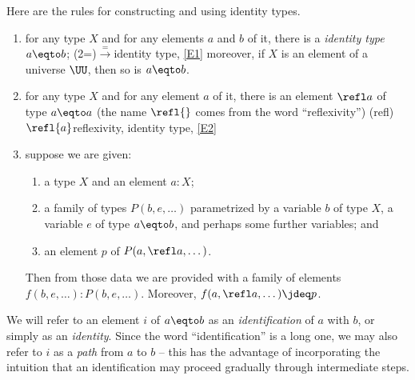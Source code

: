Here are the rules for constructing and using identity types.
\begin{enumerate}[label=(E\arabic*),ref=(E\arabic*)]\label{rules-for-equality}
  \item\label{E1}
    for any type $X$ and for any elements $a$ and $b$ of it, there is a \emph{identity type} $a \eqto b$;%
    \glossary(2=){$\xrightarrow =$}{identity type, \cref{E1}}%
    moreover, if $X$ is an element of a universe $\UU$, then so is $a \eqto b$.
  \item\label{E2} for any type $X$ and for any element $a$ of it, there is an element $\refl a$ of type $a \eqto a$
    (the name $\refl{}$ comes from the word ``reflexivity'')%
    \glossary(refl){$\protect\refl{a}$}{reflexivity, identity type, \cref{E2}}
  \item\label{E3} suppose we are given:
    \begin{enumerate}
    \item a type $X$ and an element $a:X$;
    \item a family of types $P(b,e,\dots)$ parametrized by a variable $b$ of type $X$, a variable $e$ of type $a \eqto b$, and perhaps some
      further variables; and
    \item an element $p$ of $P(a,\refl a,\dots)$.
    \end{enumerate}
    Then from those data we are provided with a family of elements $f(b,e,\dots) : P(b,e,\dots)$.
    Moreover, $f(a,\refl a,\dots) \jdeq p$.
\end{enumerate}

We will refer to an element $i$ of $a \eqto b$ as an \emph{identification} of $a$ with $b$, or simply as an
\emph{identity}.  Since the word ``identification'' is a long one, we may also refer to $i$ as a \emph{path} from $a$ to
$b$ -- this has the advantage of incorporating the intuition that an identification may proceed gradually through intermediate steps.%
%

